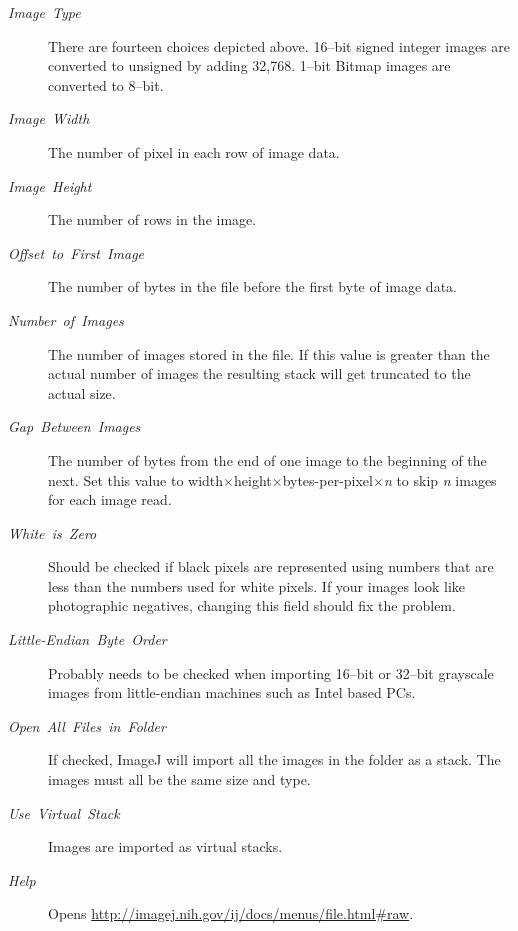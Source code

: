 \begin{description}
\item [{\emph{Image\ Type}}] There are fourteen choices depicted above.
{\small 16--bit signed integer images are converted to unsigned by
adding 32,768}. {\small 1--bit Bitmap images are converted to 8--bit.}{\small \par}
\item [{\emph{Image\ Width}}] The number of pixel in each row of image
data.
\item [{\emph{Image\ Height}}] The number of rows in the image.
\item [{\emph{Offset\ to\ First\ Image}}] The number of bytes in the
file before the first byte of image data.
\item [{\emph{Number\ of\ Images}}] The number of images stored in the
file. If this value is greater than the actual number of images the
resulting stack will get truncated to the actual size.
\item [{\emph{Gap\ Between\ Images}}] The number of bytes from the end
of one image to the beginning of the next. Set this value to width$\times$height$\times$bytes-per-pixel$\times$\emph{n}
to skip \emph{n} images for each image read.
\item [{\emph{White\ is\ Zero}}] Should be checked if black pixels are
represented using numbers that are less than the numbers used for
white pixels. If your images look like photographic negatives, changing
this field should fix the problem.
\item [{\emph{Little-Endian\ Byte\ Order}}] Probably needs to be checked
when importing 16--bit or 32--bit grayscale images from little-endian
machines such as Intel based PCs.
\item [{\emph{Open\ All\ Files\ in\ Folder}}] If checked, ImageJ will
import all the images in the folder as a stack. The images must all
be the same size and type.
\item [{\emph{Use\ Virtual\ Stack}}] Images are imported as virtual stacks.
\item [{\emph{Help}}] Opens \url{http://imagej.nih.gov/ij/docs/menus/file.html#raw}.
\end{description}



\subsubsection{\protect{}\label{sub:Import>LUT}}

